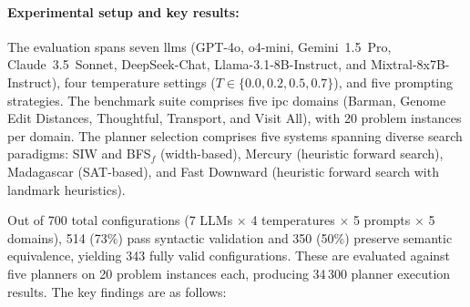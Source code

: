 \paragraph{Experimental setup and key results:}
The evaluation spans seven \glspl{llm} (GPT-4o, o4-mini, Gemini~1.5~Pro, Claude~3.5~Sonnet, DeepSeek-Chat, Llama-3.1-8B-Instruct, and Mixtral-8x7B-Instruct), four temperature settings ($T \in \{0.0, 0.2, 0.5, 0.7\}$), and five prompting strategies. The benchmark suite comprises five \gls{ipc} domains (Barman, Genome Edit Distances, Thoughtful, Transport, and Visit All), with 20 problem instances per domain.
The planner selection comprises five systems spanning diverse search paradigms: SIW and BFS$_f$ (width-based), Mercury (heuristic forward search), Madagascar (SAT-based), and Fast Downward (heuristic forward search with landmark heuristics).

Out of 700 total configurations (7 LLMs $\times$ 4 temperatures $\times$ 5 prompts $\times$ 5 domains), 514 (73\%) pass syntactic validation and 350 (50\%) preserve semantic equivalence, yielding 343 fully valid configurations.
These are evaluated against five planners on 20 problem instances each, producing 34\,300 planner execution results.
The key findings are as follows:

